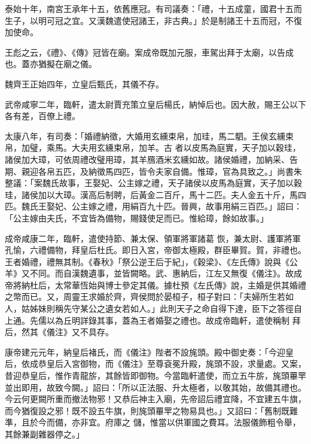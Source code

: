 \begin{pinyinscope}
 泰始十年，南宮王承年十五，依舊應冠。有司議奏：「禮，十五成童，國君十五而生子，以明可冠之宜。又漢魏遣使冠諸王，非古典。」於是制諸王十五而冠，不復加使命。



 王彪之云，《禮》、《傳》冠皆在廟。案成帝既加元服，車駕出拜于太廟，以告成也。蓋亦猶擬在廟之儀。



 魏齊王正始四年，立皇后甄氏，其儀不存。



 武帝咸寧二年，臨軒，遣太尉賈充策立皇后楊氏，納悼后也。因大赦，賜王公以下各有差，百僚上禮。



 太康八年，有司奏：「婚禮納徵，大婚用玄纁束帛，加珪，馬二駟。王侯玄纁束帛，加璧，乘馬。大夫用玄纁束帛，加羊。古
 者以皮馬為庭實，天子加以穀珪，諸侯加大璋，可依周禮改璧用璋，其羊鴈酒米玄纁如故。諸侯婚禮，加納采、告期、親迎各帛五匹，及納徵馬四匹，皆令夫家自備。惟璋，官為具致之。」尚書朱整議：「案魏氏故事，王娶妃、公主嫁之禮，天子諸侯以皮馬為庭實，天子加以穀珪，諸侯加以大璋。漢高后制聘，后黃金二百斤，馬十二匹。夫人金五十斤，馬四匹。魏氏王娶妃、公主嫁之禮，用絹百九十匹。晉興，故事用絹三百匹。」詔曰：「公主嫁由夫氏，不宜皆為備物，賜錢使足而已。惟給璋，餘如故事。」



 成帝咸康二年，臨軒，遣使持節、兼太保、領軍將軍諸葛
 恢，兼太尉、護軍將軍孔愉，六禮備物，拜皇后杜氏。即日入宮，帝御太極殿，群臣畢賀。賀，非禮也。王者婚禮，禮無其制。《春秋》「祭公逆王后于紀」，《穀梁》、《左氏傳》說與《公羊》又不同。而自漢魏遺事，並皆闕略。武、惠納后，江左又無復《儀注》。故成帝將納杜后，太常華恆始與博士參定其儀。據杜預《左氏傳》說，主婚是供其婚禮之幣而已。又，周靈王求婚於齊，齊侯問於晏桓子，桓子對曰：「夫婦所生若如人，姑姊妹則稱先守某公之遺女若如人。」此則天子之命自得下達，臣下之答徑自上通。先儒以為丘明詳錄其事，蓋為王者婚娶之禮也。故成帝臨軒，遣使稱制
 拜后，然其《儀注》又不具存。



 康帝建元元年，納皇后褚氏，而《儀注》陛者不設旄頭。殿中御史奏：「今迎皇后，依成恭皇后入宮御物，而《儀注》至尊袞冕升殿，旄頭不設，求量處。又案，昔迎恭皇后，惟作青龍旂，其餘皆即御物。今當臨軒遣使，而立五牛旂，旄頭罼䍐並出即用，故致今闕。」詔曰：「所以正法服、升太極者，以敬其始，故備其禮也。今云何更闕所重而撤法物邪！又恭后神主入廟，先帝詔后禮宜降，不宜建五牛旗，而今猶復設之邪！既不設五牛旗，則旄頭罼䍐之物易具也。」又詔曰：「舊制既難準，且於今而備，亦非宜。府庫之
 儲，惟當以供軍國之費耳。法服儀飾粗令舉，其餘兼副雜器停之。」




\end{pinyinscope}

